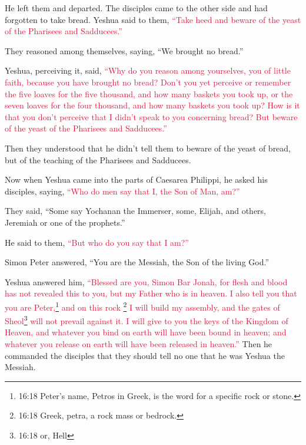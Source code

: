 He left them and departed.
\myverse{}The disciples came to the other side and had forgotten to take bread.
\myverse{}Yeshua said to them,
\textcolor{crimson}{“Take heed and beware of the yeast of the Pharisees and Sadducees.”}

\myverse{}They reasoned among themselves, saying, “We brought no bread.”

\myverse{}Yeshua, perceiving it, said,
\textcolor{crimson}{“Why do you reason among yourselves, you of little faith, because you have brought no bread?
}
\myverse{}\textcolor{crimson}{Don’t you yet perceive or remember the five loaves for the five thousand,
	and how many baskets you took up,
}
\myverse{}\textcolor{crimson}{or the seven loaves for the four thousand, and how many baskets you took
	up?
}
\myverse{}\textcolor{crimson}{How is it that you don’t perceive that I didn’t speak to you concerning
	bread? But beware of the yeast of the Pharisees and Sadducees.”
}

\myverse{}Then they understood that he didn’t tell them to beware of the
yeast of bread, but of the teaching of the Pharisees and Sadducees.

\myverse{}Now when Yeshua came into the parts of Caesarea Philippi, he
asked his disciples, saying,
\textcolor{crimson}{“Who do men say that I, the Son of Man, am?”}

\myverse{}They said, “Some say Yochanan the Immerser, some, Elijah, and
others, Jeremiah or one of the prophets.”

\myverse{}He said to them,
\textcolor{crimson}{“But who do you say that I am?”}

\myverse{}Simon Peter answered, “You are the Messiah, the Son of the living
God.”

\myverse{}Yeshua answered him,
\textcolor{crimson}{“Blessed are you, Simon Bar Jonah, for flesh and blood has not revealed this to you, but my Father
	who is in heaven.
}
\myverse{}\textcolor{crimson}{I also tell you that you are Peter,}\footnote{16:18 Peter’s name, Petros in Greek, is the word for a specific rock or stone.}
\textcolor{crimson}{and on this rock
}\footnote{16:18 Greek, petra, a rock mass or bedrock.}
\textcolor{crimson}{I will build my assembly, and the gates of Sheol}\footnote{16:18 or, Hell}
\textcolor{crimson}{will not prevail against it.
}
\myverse{}\textcolor{crimson}{I will give to you the keys of the Kingdom of Heaven, and whatever you
	bind on earth will have been bound in heaven; and whatever you release on earth will have been released
	in heaven.”}
\myverse{}Then he commanded the disciples that they should tell no one that he was
Yeshua the Messiah.

